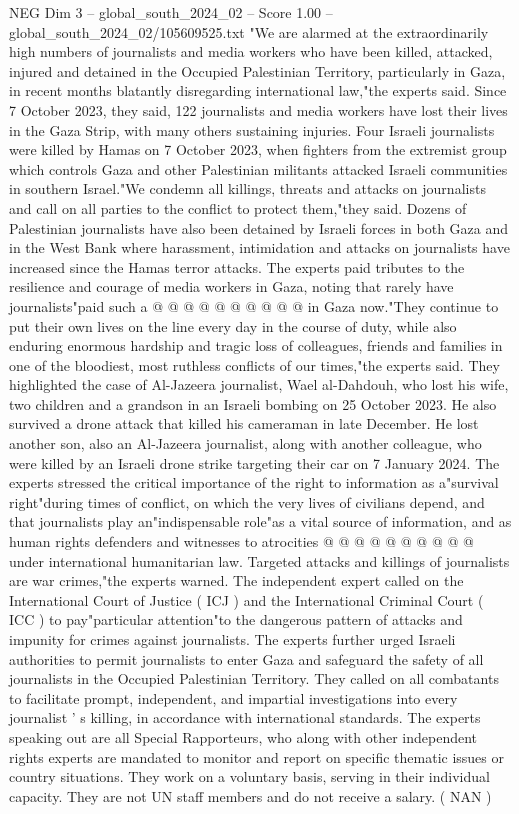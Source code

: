 \begin{textsample}{NEG Dim 3 – global\_south\_2024\_02 – Score 1.00 – global\_south\_2024\_02/105609525.txt}  \label{ex:f3_neg_095}
"We are alarmed at the extraordinarily high numbers of journalists and media workers who have been killed, attacked, injured and detained in the Occupied Palestinian Territory, particularly in Gaza, in recent months blatantly disregarding international law,"the experts said.
Since 7 October 2023, they said, 122 journalists and media workers have lost their lives in the Gaza Strip, with many others sustaining injuries.
Four Israeli journalists were killed by Hamas on 7 October 2023, when fighters from the extremist group which controls Gaza and other Palestinian militants attacked Israeli communities in southern Israel."We condemn all killings, threats and attacks on journalists and call on all parties to the conflict to protect them,"they said.
Dozens of Palestinian journalists have also been detained by Israeli forces in both Gaza and in the West Bank where harassment, intimidation and attacks on journalists have increased since the Hamas terror attacks.
The experts paid tributes to the resilience and courage of media workers in Gaza, noting that rarely have journalists"paid such a @ @ @ @ @ @ @ @ @ @ in Gaza now."They continue to put their own lives on the line every day in the course of duty, while also enduring enormous hardship and tragic loss of colleagues, friends and families in one of the bloodiest, most ruthless conflicts of our times,"the experts said.
They highlighted the case of Al-Jazeera journalist, Wael al-Dahdouh, who lost his wife, two children and a grandson in an Israeli bombing on 25 October 2023.
He also survived a drone attack that killed his cameraman in late December.
He lost another son, also an Al-Jazeera journalist, along with another colleague, who were killed by an Israeli drone strike targeting their car on 7 January 2024.
The experts stressed the critical importance of the right to information as a"survival right"during times of conflict, on which the very lives of civilians depend, and that journalists play an"indispensable role"as a vital source of information, and as human rights defenders and witnesses to atrocities @ @ @ @ @ @ @ @ @ @ under international humanitarian law.
Targeted attacks and killings of journalists are war crimes,"the experts warned.
The independent expert called on the International Court of Justice ( ICJ ) and the International Criminal Court ( ICC ) to pay"particular attention"to the dangerous pattern of attacks and impunity for crimes against journalists.
The experts further urged Israeli authorities to permit journalists to enter Gaza and safeguard the safety of all journalists in the Occupied Palestinian Territory.
They called on all combatants to facilitate prompt, independent, and impartial investigations into every journalist ' s killing, in accordance with international standards.
The experts speaking out are all Special Rapporteurs, who along with other independent rights experts are mandated to monitor and report on specific thematic issues or country situations.
They work on a voluntary basis, serving in their individual capacity.
They are not UN staff members and do not receive a salary. ( NAN )

\end{textsample}
